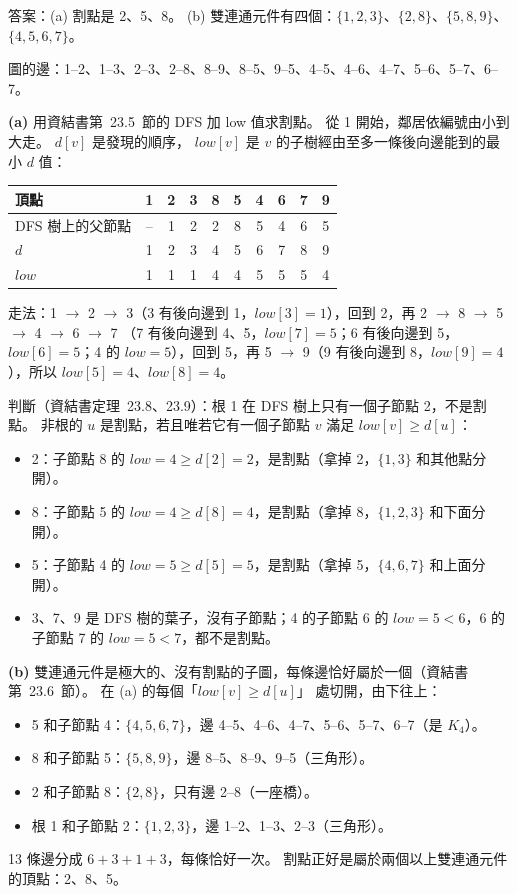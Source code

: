 \begin{pastsoln}
答案：(a) 割點是 2、5、8。 (b) 雙連通元件有四個：$\{1, 2, 3\}$、$\{2, 8\}$、$\{5, 8, 9\}$、$\{4, 5, 6, 7\}$。

圖的邊：1--2、1--3、2--3、2--8、8--9、8--5、9--5、4--5、4--6、4--7、5--6、5--7、6--7。

\textbf{(a)} 用資結書第~23.5~節的 DFS 加 low 值求割點。 從 1 開始，鄰居依編號由小到大走。 $d[v]$ 是發現的順序，
$\mathit{low}[v]$ 是 $v$ 的子樹經由至多一條後向邊能到的最小 $d$ 值：
\begin{center}
\begin{tabular}{l*{9}{c}}
\toprule
頂點 & 1 & 2 & 3 & 8 & 5 & 4 & 6 & 7 & 9 \\
\midrule
DFS 樹上的父節點 & -- & 1 & 2 & 2 & 8 & 5 & 4 & 6 & 5 \\
$d$ & 1 & 2 & 3 & 4 & 5 & 6 & 7 & 8 & 9 \\
$\mathit{low}$ & 1 & 1 & 1 & 4 & 4 & 5 & 5 & 5 & 4 \\
\bottomrule
\end{tabular}
\end{center}
走法：1 $\to$ 2 $\to$ 3（3 有後向邊到 1，$\mathit{low}[3] = 1$），回到 2，再 2 $\to$ 8 $\to$ 5 $\to$ 4 $\to$ 6 $\to$ 7
（7 有後向邊到 4、5，$\mathit{low}[7] = 5$；6 有後向邊到 5，$\mathit{low}[6] = 5$；4 的 $\mathit{low} = 5$），回到 5，再
5 $\to$ 9（9 有後向邊到 8，$\mathit{low}[9] = 4$），所以 $\mathit{low}[5] = 4$、$\mathit{low}[8] = 4$。

判斷（資結書定理~23.8、23.9）：根 1 在 DFS 樹上只有一個子節點 2，不是割點。 非根的 $u$ 是割點，若且唯若它有一個子節點 $v$
滿足 $\mathit{low}[v] \ge d[u]$：
\begin{itemize}[nosep]
\item 2：子節點 8 的 $\mathit{low} = 4 \ge d[2] = 2$，是割點（拿掉 2，$\{1, 3\}$ 和其他點分開）。
\item 8：子節點 5 的 $\mathit{low} = 4 \ge d[8] = 4$，是割點（拿掉 8，$\{1, 2, 3\}$ 和下面分開）。
\item 5：子節點 4 的 $\mathit{low} = 5 \ge d[5] = 5$，是割點（拿掉 5，$\{4, 6, 7\}$ 和上面分開）。
\item 3、7、9 是 DFS 樹的葉子，沒有子節點；4 的子節點 6 的 $\mathit{low} = 5 < 6$，6 的子節點 7 的 $\mathit{low} = 5 < 7$，都不是割點。
\end{itemize}

\textbf{(b)} 雙連通元件是極大的、沒有割點的子圖，每條邊恰好屬於一個（資結書第~23.6~節）。 在 (a) 的每個「$\mathit{low}[v] \ge d[u]$」
處切開，由下往上：
\begin{itemize}[nosep]
\item 5 和子節點 4：$\{4, 5, 6, 7\}$，邊 4--5、4--6、4--7、5--6、5--7、6--7（是 $K_4$）。
\item 8 和子節點 5：$\{5, 8, 9\}$，邊 8--5、8--9、9--5（三角形）。
\item 2 和子節點 8：$\{2, 8\}$，只有邊 2--8（一座橋）。
\item 根 1 和子節點 2：$\{1, 2, 3\}$，邊 1--2、1--3、2--3（三角形）。
\end{itemize}
13 條邊分成 $6 + 3 + 1 + 3$，每條恰好一次。 割點正好是屬於兩個以上雙連通元件的頂點：2、8、5。
\end{pastsoln}
